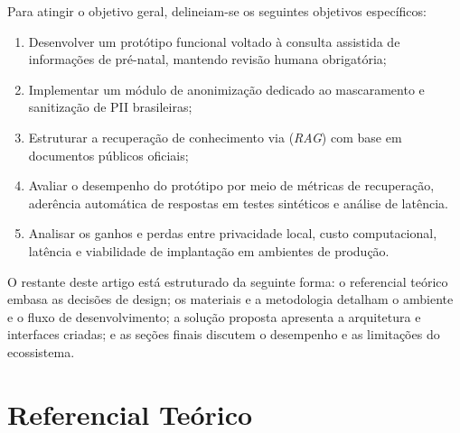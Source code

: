 \documentclass[12pt]{article}
\begin{document}

Para atingir o objetivo geral, delineiam-se os seguintes objetivos específicos:

\begin{enumerate}
  \item Desenvolver um protótipo funcional voltado à consulta assistida de informações de pré-natal, mantendo revisão humana obrigatória;
  \item Implementar um módulo de anonimização dedicado ao mascaramento e sanitização de PII brasileiras;
  \item Estruturar a recuperação de conhecimento via (\textit{RAG}) com base em documentos públicos oficiais;
  \item Avaliar o desempenho do protótipo por meio de métricas de recuperação, aderência automática de respostas em testes sintéticos e análise de latência.
  \item Analisar os ganhos e perdas entre privacidade local, custo computacional, latência e viabilidade de implantação em ambientes de produção.
\end{enumerate}

O restante deste artigo está estruturado da seguinte forma: o referencial teórico embasa as decisões de design; os materiais e a metodologia detalham o ambiente e o fluxo de desenvolvimento; a solução proposta apresenta a arquitetura e interfaces criadas; e as seções finais discutem o desempenho e as limitações do ecossistema.


\section{Referencial Teórico}
\end{document}
